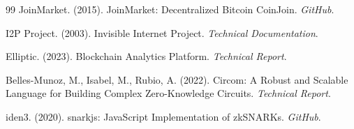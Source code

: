 \documentclass[11pt]{article}
\theoremstyle{definition}
\theoremstyle{plain}
\theoremstyle{remark}
\begin{document}
\begin{thebibliography}{99}
JoinMarket. (2015). JoinMarket: Decentralized Bitcoin CoinJoin. \textit{GitHub}.

I2P Project. (2003). Invisible Internet Project. \textit{Technical Documentation}.

Elliptic. (2023). Blockchain Analytics Platform. \textit{Technical Report}.

Belles-Munoz, M., Isabel, M., Rubio, A. (2022). Circom: A Robust and Scalable Language for Building Complex Zero-Knowledge Circuits. \textit{Technical Report}.

iden3. (2020). snarkjs: JavaScript Implementation of zkSNARKs. \textit{GitHub}.

\end{thebibliography}
\end{document}
